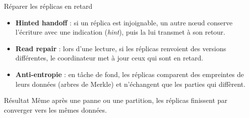 \begin{frame}{Réparer les réplicas en retard}
    \begin{itemize}
        \item \textbf{Hinted handoff} : si un réplica est injoignable, un autre
              nœud conserve l'écriture avec une indication (\textit{hint}), puis
              la lui transmet à son retour.
        \item \textbf{Read repair} : lors d'une lecture, si les réplicas
              renvoient des versions différentes, le coordinateur met à jour
              ceux qui sont en retard.
        \item \textbf{Anti-entropie} : en tâche de fond, les réplicas comparent
              des empreintes de leurs données (arbres de Merkle) et n'échangent
              que les parties qui diffèrent.
    \end{itemize}

    \begin{examplebox}{Résultat}
        Même après une panne ou une partition, les réplicas finissent par
        converger vers les mêmes données.
    \end{examplebox}

\end{frame}

